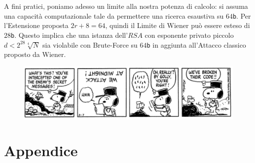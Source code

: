 \documentclass[twoside,symmetric,justified,openany,nobib]{tufte-book}
\begin{document}
\noindent
A fini pratici, poniamo adesso un limite alla nostra potenza di calcolo: si assuma una capacità computazionale tale da permettere una ricerca esaustiva su $64${\normalfont\texttt{b}}. Per l'Estensione proposta $2r{+}8{=}64$, quindi il Limite di Wiener può essere esteso di $28${\normalfont\texttt{b}}. Questo implica che una istanza dell'$RSA$ con esponente privato piccolo $d{<}2^{28}\sqrt[4]{N}$ sia violabile con Brute-Force su $64${\normalfont\texttt{b}} in aggiunta all'Attacco classico proposto da Wiener.
\vspace*{\fill}
\begin{figure}
  \centering
  \includegraphics[width=0.95\linewidth]{woodstock_and_snoopy.pdf}
\end{figure}

\vspace{-19pt}
\hspace{-3pt}\begin{minipage}[b]{\textwidth}
\end{minipage}













% 

% 
\chapter*{\hypertarget{chwiener}{\hspace{.55cm}\normalfont\textbf{Appendice}}}
\end{document}
